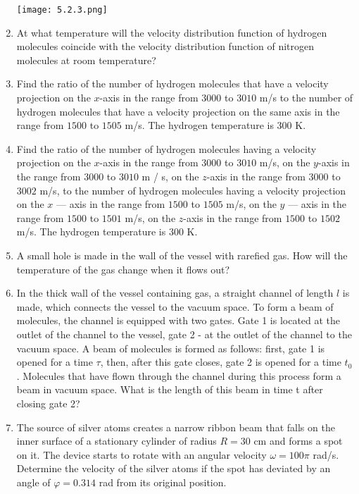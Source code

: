 \documentclass{article}
\begin{document}
\begin{enumerate}[label=5.2.\arabic*]
\begin{center}
    \texttt{[image: 5.2.3.png]}
\end{center}

\item At what temperature will the velocity distribution function of hydrogen molecules coincide with the velocity distribution function of nitrogen molecules at room temperature?

\item Find the ratio of the number of hydrogen molecules that have a velocity projection on the $x$-axis in the range from $3000$ to $3010$ m/s to the number of hydrogen molecules that have a velocity projection on the same axis in the range from $1500$ to $1505$ m/s. The hydrogen temperature is $300$ K.

\item Find the ratio of the number of hydrogen molecules having a velocity projection on the $x$-axis in the range from $3000$ to $3010$ m/s, on the $y$-axis in the range from $3000$ to $3010$ m / s, on the $z$-axis in the range from $3000$ to $3002$ m/s, to the number of hydrogen molecules having a velocity projection on the $x$ — axis in the range from $1500$ to $1505$ m/s, on the $y$ — axis in the range from $1500$ to $1501$ m/s, on the $z$-axis in the range from $1500$ to $1502$ m/s. The hydrogen temperature is $300$ K.

\item A small hole is made in the wall of the vessel with rarefied gas. How will the temperature of the gas change when it flows out?

\item In the thick wall of the vessel containing gas, a straight channel of length $l$ is made, which connects the vessel to the vacuum space. To form a beam of molecules, the channel is equipped with two gates. Gate 1 is located at the outlet of the channel to the vessel, gate 2 - at the outlet of the channel to the vacuum space. A beam of molecules is formed as follows: first, gate 1 is opened for a time $\tau$, then, after this gate closes, gate 2 is opened for a time $t_0$. Molecules that have flown through the channel during this process form a beam in vacuum space. What is the length of this beam in time t after closing gate 2?

\item The source of silver atoms creates a narrow ribbon beam that falls on the inner surface of a stationary cylinder of radius $R = 30$ cm and forms a spot on it. The device starts to rotate with an angular velocity $\omega = 100 \pi$ rad/s. Determine the velocity of the silver atoms if the spot has deviated by an angle of $\varphi = 0.314$ rad from its original position.



\end{enumerate}
\end{document}

